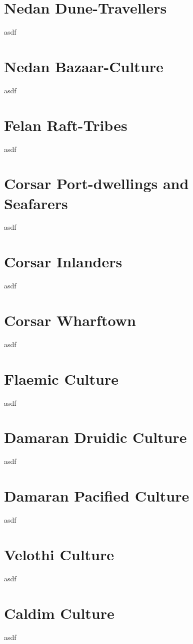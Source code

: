 \section{Nedan Dune-Travellers}
asdf

\section{Nedan Bazaar-Culture}
asdf

\section{Felan Raft-Tribes}
asdf

\section{Corsar Port-dwellings and Seafarers}
asdf

\section{Corsar Inlanders}
asdf

\section{Corsar Wharftown}
asdf

\section{Flaemic Culture} %
asdf

\section{Damaran Druidic Culture}
asdf

\section{Damaran Pacified Culture}
asdf

\section{Velothi Culture} %
asdf

\section{Caldim Culture} %
asdf